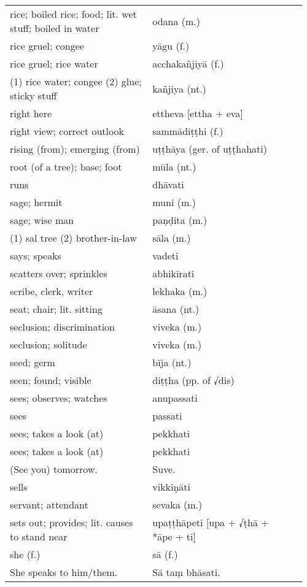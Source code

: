 \documentclass[a5paper]{memoir}
\begin{document}
\begin{longtable}{L{0.48\linewidth} L{0.48\linewidth} H}
rice; boiled rice; food; lit. wet stuff; boiled in water & odana (m.) & \\[0pt]
rice gruel; congee & yāgu (f.) & \\[0pt]
rice gruel; rice water & acchakañjiyā (f.) & \\[0pt]
(1) rice water; congee (2) glue; sticky stuff & kañjiya (nt.) & \\[0pt]
right here & ettheva [ettha + eva] & \\[0pt]
right view; correct outlook & sammādiṭṭhi (f.) & \\[0pt]
rising (from); emerging (from) & uṭṭhāya (ger. of uṭṭhahati) & \\[0pt]
root (of a tree); base; foot & mūla (nt.) & \\[0pt]
runs & dhāvati & \\[0pt]
sage; hermit & muni (m.) & \\[0pt]
sage; wise man & paṇḍita (m.) & \\[0pt]
(1) sal tree (2) brother-in-law & sāla (m.) & \\[0pt]
says; speaks & vadeti & \\[0pt]
scatters over; sprinkles & abhikīrati & \\[0pt]
scribe, clerk, writer & lekhaka (m.) & \\[0pt]
seat; chair; lit. sitting & āsana (nt.) & \\[0pt]
seclusion; discrimination & viveka (m.) & \\[0pt]
seclusion; solitude & viveka (m.) & \\[0pt]
seed; germ & bīja (nt.) & \\[0pt]
seen; found; visible & diṭṭha (pp. of √dis) & \\[0pt]
sees; observes; watches & anupassati & \\[0pt]
sees & passati & \\[0pt]
sees; takes a look (at) & pekkhati & \\[0pt]
sees; takes a look (at) & pekkhati & \\[0pt]
(See you) tomorrow. & Suve. & \\[0pt]
sells & vikkiṇāti & \\[0pt]
servant; attendant & sevaka (m.) & \\[0pt]
sets out; provides; lit. causes to stand near & upaṭṭhāpeti [upa + √ṭhā + *āpe + ti] & \\[0pt]
she (f.) & sā (f.) & \\[0pt]
She speaks to him/them. & Sā taṃ bhāsati. & \\[0pt]

\end{longtable}
\end{document}

